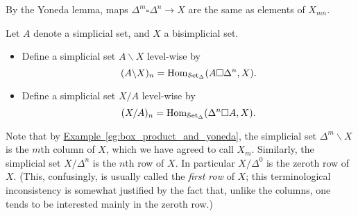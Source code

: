 \documentclass[main.tex]{subfiles}
\begin{document}
\begin{example}
  \label{eg:box_product_and_yoneda}
  By the Yoneda lemma, maps $\Delta^{m} \square \Delta^{n} \to X$ are the same as elements of $X_{mn}$.
\end{example}

\begin{definition}
  \label{def:left_and_right_divison_functors}
  Let $A$ denote a simplicial set, and $X$ a bisimplicial set.
  \begin{itemize}
    \item Define a simplicial set $A \backslash X$ level-wise by
      \begin{equation*}
        (A \backslash X)_{n} = \mathrm{Hom}_{\mathcal{S}\mathrm{et}_{\Delta}}(A \square \Delta^{n}, X).
      \end{equation*}

    \item Define a simplicial set $X / A$ level-wise by
      \begin{equation*}
        (X / A)_{n} = \mathrm{Hom}_{\mathcal{S}\mathrm{et}_{\Delta}}(\Delta^{n} \square A, X).
      \end{equation*}
  \end{itemize}
\end{definition}

Note that by \hyperref[eg:box_product_and_yoneda]{Example~\ref*{eg:box_product_and_yoneda}}, the simplicial set $\Delta^{m} \backslash X$ is the $m$th column of $X$, which we have agreed to call $X_{m}$. Similarly, the simplicial set $X / \Delta^{n}$ is the $n$th row of $X$. In particular $X / \Delta^{0}$ is the zeroth row of $X$. (This, confusingly, is usually called the \emph{first row} of $X$; this terminological inconsistency is somewhat justified by the fact that, unlike the columns, one tends to be interested mainly in the zeroth row.) 
\end{document}
